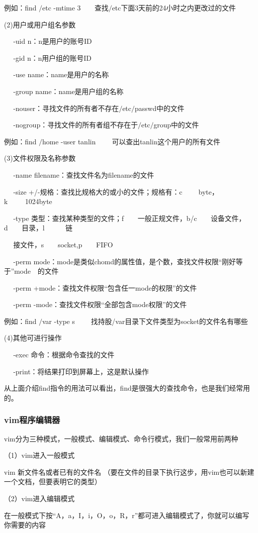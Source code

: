 \documentclass{article}
\begin{document}
例如：find $\slash$etc -mtime 3~~~~查找$\slash$etc下面3天前的24小时之内更改过的文件

(2)用户或用户组名参数

~~ -uid n：n是用户的账号ID

~~ -gid n：n用户组的账号ID

~~ -use name：name是用户的名称

~~ -group name：name是用户组的名称

~~ -nouser：寻找文件的所有者不存在$\slash$etc$\slash$passwd中的文件

~~ -nogroup：寻找文件的所有者组不存在于$\slash$etc$\slash$group中的文件

例如：find $\slash$home -user tanlin ~~~~可以查出tanlin这个用户的所有文件

(3)文件权限及名称参数

~~ -name filename：查找文件名为filename的文件

~~ -size +/-规格：查找比规格大的或小的文件；规格有：c ~~~~byte，k~~~~~1024byte

~~ -type 类型：查找某种类型的文件；f~~~~一般正规文件，b/c~~~~设备文件，d~~~~目录，l~~~~~~链

~~ 接文件，s~~~~socket,p~~~~FIFO

~~ -perm mode：mode是类似chomd的属性值，是个数，查找文件权限“刚好等于”mode~~的文件

~~ -perm +mode：查找文件权限“包含任一mode的权限”的文件

~~ -perm -mode：查找文件权限“全部包含mode权限”的文件

例如：find $\slash$var -type s  ~~~~找持股/var目录下文件类型为socket的文件名有哪些

(4)其他可进行操作

~~ -exec 命令：根据命令查找的文件

~~ -print：将结果打印到屏幕上，这是默认操作

从上面介绍find指令的用法可以看出，find是很强大的查找命令，也是我们经常用的。
\subsubsection{vim程序编辑器}
vim分为三种模式，一般模式、编辑模式、命令行模式，我们一般常用前两种

（1）vim进入一般模式

vim 新文件名或者已有的文件名  （要在文件的目录下执行这步，用vim也可以新建一个文档，但要表明它的类型）

（2）vim进入编辑模式

在一般模式下按“A，a，I，i，O，o，R，r”都可进入编辑模式了，你就可以编写你需要的内容
\end{document}
